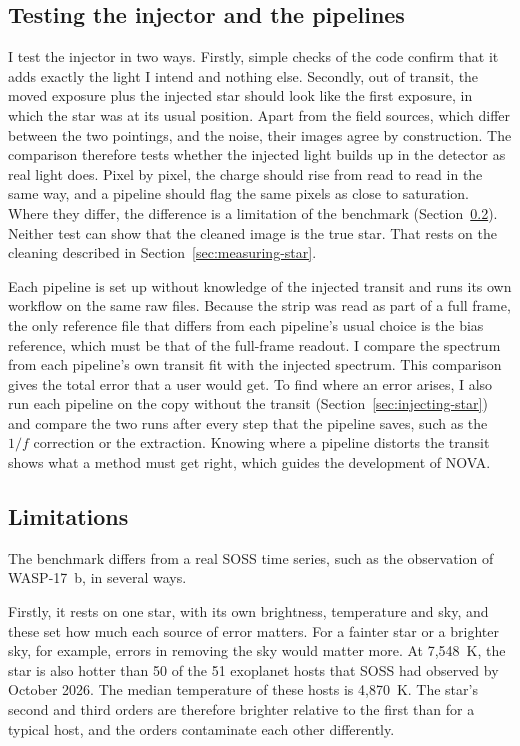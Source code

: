 \subsection{Testing the injector and the pipelines}
\label{sec:tests}

I test the injector in two ways. Firstly, simple checks of the code confirm
that it adds exactly the light I intend and nothing else. Secondly, out of
transit, the moved exposure plus the injected star should look like the first
exposure, in which the star was at its usual position. Apart
from the field sources, which differ between the two pointings, and the noise,
their images agree by construction. The comparison therefore tests whether the
injected light builds up in the detector as real light does. Pixel by pixel,
the charge should rise from read to read in the same way, and a pipeline should
flag the same pixels as close to saturation. Where they differ, the difference
is a limitation of the benchmark (Section~\ref{sec:benchmark-limits}). Neither
test can show that the cleaned image is the true star. That rests on the
cleaning described in Section~\ref{sec:measuring-star}.

Each pipeline is set up without knowledge of the injected transit and runs
its own workflow on the same raw files. Because the strip was read as part of a
full frame, the only reference file that differs from each pipeline's usual
choice is the bias reference, which must be that of the full-frame readout. I
compare the spectrum from each pipeline's own transit fit with the injected
spectrum. This comparison gives the total error that a user would get. To find where an
error arises, I also run each pipeline on the copy without the transit (Section~\ref{sec:injecting-star}) and
compare the two runs after every step that the pipeline saves, such as the
$1/f$ correction or the extraction. Knowing
where a pipeline distorts the transit shows what a method must get right,
which guides the development of NOVA.

\subsection{Limitations}
\label{sec:benchmark-limits}

The benchmark differs from a real SOSS time series, such as the observation of
WASP-17~b, in several ways.

Firstly, it rests on one star, with its own brightness, temperature and sky,
and these set how much each source of error matters. For a fainter star or a
brighter sky, for example, errors in removing the sky would matter more. At 7,548~K, the star is also hotter than 50 of the 51 exoplanet hosts that SOSS had observed by October 2026. The median temperature of these hosts is 4,870~K. The star's second and third orders are therefore brighter relative to the first than for a typical host, and the orders contaminate each other differently.

